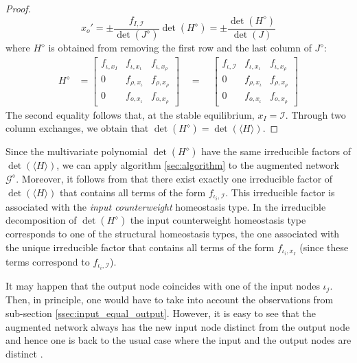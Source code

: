 \documentclass[pdflatex,sn-basic,Numbered]{sn-jnl}
\newcommand{\GG}{{\mathcal G}}
\newcommand{\II}{{\mathcal I}}
\theoremstyle{thmstyleone}%
\numberwithin{equation}{section}
\begin{document}
\begin{proof}
\[
x_o'=\pm \frac{f_{I,\mathcal{I}}}{\det(J^\diamond)}\det(H^\diamond) = \pm \frac{\det(H^\diamond)}{\det(J)}
\]
where $H^\diamond$ is obtained from removing the first row and the last column of $J^\diamond$:
\begin{equation}
\begin{aligned}
H^\diamond &= \begin{bmatrix}
f_{\iota, x_{I}} & f_{\iota, x_{\iota}} & f_{\iota, x_{\rho}}\\
0 & f_{\rho, x_{\iota}} & f_{\rho, x_{\rho}}\\
0 & f_{o, x_{\iota}} & f_{o, x_{\rho}}
\end{bmatrix} 
\quad = \quad
\begin{bmatrix}
f_{\iota, \mathcal{I}} & f_{\iota, x_{\iota}} & f_{\iota, x_{\rho}}\\
0 & f_{\rho, x_{\iota}} & f_{\rho, x_{\rho}}\\
0 & f_{o, x_{\iota}} & f_{o, x_{\rho}}
\end{bmatrix}
\end{aligned}
\end{equation}
The second equality follows that, at the stable equilibrium, $x_I=\mathcal{I}$. 
Through two column exchanges, we obtain that $\det(H^\diamond) = \det(\langle H \rangle)$. 
\end{proof}

Since the multivariate polynomial 
$\det(H^\diamond)$ have the same irreducible factors of $\det(\langle H \rangle)$, we can apply algorithm \ref{sec:algorithm} to the augmented network $\GG^\diamond$.
Moreover, it follows from \cite[Thm. 3.26]{madeira2022homeostasis} that there exist exactly one irreducible factor of $\det(\langle H \rangle)$ that contains all terms of the form $f_{\iota_i,\II}$.
This irreducible factor is associated with the \emph{input counterweight} homeostasis type.
In the irreducible decomposition of $\det(H^\diamond)$ the input counterweight homeostasis type corresponds to one of the structural homeostasis types, the one associated with the unique irreducible factor that contains all terms of the form $f_{\iota_i,x_I}$ (since these terms correspond to $f_{\iota_i,\II}$).

It may happen that the output node coincides with one of the input nodes $\iota_j$.
Then, in principle, one would have to take into account the observations from sub-section \ref{ssec:input_equal_output}.
However, it is easy to see that the augmented network always has the new input node distinct from the output node and hence one is back to the usual case where the input and the output nodes are distinct \cite{WHAG21}. 
\end{document}
